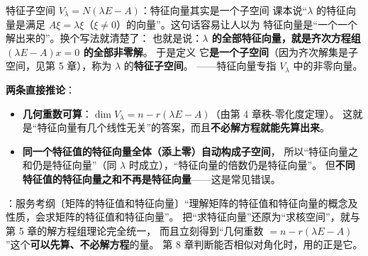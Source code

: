 %





\begin{fdeep}{特征子空间 $V_{\lambda}=N(\lambda E-A)$：特征向量其实是一个子空间}
课本说“$\lambda$ 的特征向量是满足 $A\xi=\lambda\xi$（$\xi\ne0$）的向量”。这句话容易让人以为
特征向量是“一个一个解出来的”。换个写法就清楚了：
也就是说：\textbf{$\lambda$ 的全部特征向量，就是齐次方程组 $(\lambda E-A)x=0$ 的全部非零解}。
于是定义
它\textbf{是一个子空间}（因为齐次解集是子空间，见第 5 章），称为 $\lambda$ 的\textbf{特征子空间}。
——特征向量专指 $V_{\lambda}$ 中的非零向量。

\textbf{两条直接推论}：
\begin{itemize}[leftmargin=2.2em,itemsep=0.22em]
\item \textbf{几何重数可算}：$\dim V_{\lambda}=n-r(\lambda E-A)$（由第 4 章秩-零化度定理）。
      这就是“特征向量有几个线性无关”的答案，而且\textbf{不必解方程就能先算出来}。
\item \textbf{同一个特征值的特征向量全体（添上零）自动构成子空间}，
      所以“特征向量之和仍是特征向量”（同 $\lambda$ 时成立），“特征向量的倍数仍是特征向量”。
      但\textbf{不同特征值的特征向量之和不再是特征向量}——这是常见错误。
\end{itemize}
\fbref{}：服务考纲〔矩阵的特征值和特征向量〕“理解矩阵的特征值和特征向量的概念及性质，会求矩阵的特征值和特征向量”。
把“求特征向量”还原为“求核空间”，就与第 5 章的解方程组理论完全统一，
而且立刻得到“几何重数 $=n-r(\lambda E-A)$”这个\textbf{可以先算、不必解方程}的量。
第 8 章判断能否相似对角化时，用的正是它。
\end{fdeep}


